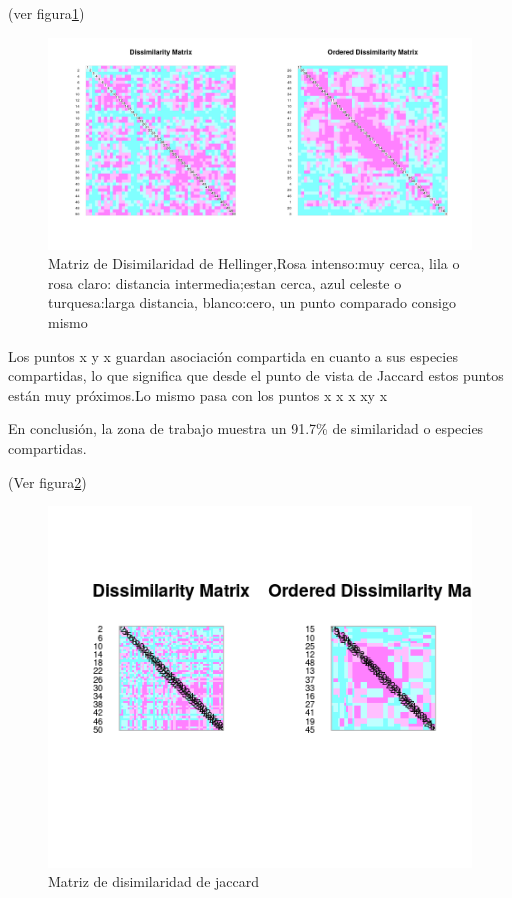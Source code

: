 \documentclass[11pt,]{article}
\begin{document}
(ver figura\ref{fig:matriz_disimilaridad_hellinger})

\begin{figure}
\centering
\includegraphics{matriz_disimilaridad_hellinger.png}
\caption{\label{fig:matriz_disimilaridad_hellinger}Matriz de
Disimilaridad de Hellinger,Rosa intenso:muy cerca, lila o rosa claro:
distancia intermedia;estan cerca, azul celeste o turquesa:larga
distancia, blanco:cero, un punto comparado consigo mismo}
\end{figure}

Los puntos x y x guardan asociación compartida en cuanto a sus especies
compartidas, lo que significa que desde el punto de vista de Jaccard
estos puntos están muy próximos.Lo mismo pasa con los puntos x x x xy x

En conclusión, la zona de trabajo muestra un 91.7\% de similaridad o
especies compartidas.

(Ver figura\ref{fig:disimilaridad_de_jaccard})

\begin{figure}
\centering
\includegraphics{disimilaridad_de_jaccard.png}
\caption{\label{fig:disimilaridad_de_jaccard}Matriz de disimilaridad de
jaccard}
\end{figure}
\end{document}
